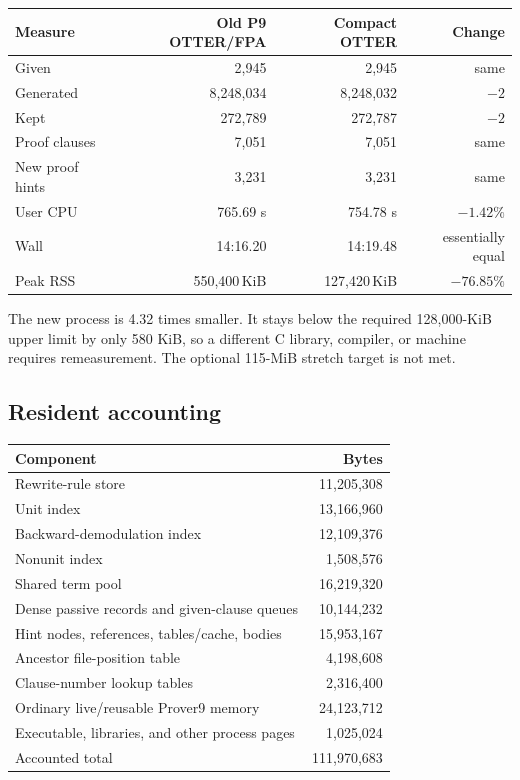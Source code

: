 \documentclass[11pt]{article}
\newcommand{\kib}{\,KiB}
\begin{document}
\begin{center}
\begin{tabular}{lrrr}
\toprule
Measure & Old P9 OTTER/FPA & Compact OTTER & Change \\
\midrule
Given & 2,945 & 2,945 & same \\
Generated & 8,248,034 & 8,248,032 & $-2$ \\
Kept & 272,789 & 272,787 & $-2$ \\
Proof clauses & 7,051 & 7,051 & same \\
New proof hints & 3,231 & 3,231 & same \\
User CPU & 765.69 s & 754.78 s & $-1.42\%$ \\
Wall & 14:16.20 & 14:19.48 & essentially equal \\
Peak RSS & 550,400\kib & 127,420\kib & $-76.85\%$ \\
\bottomrule
\end{tabular}
\end{center}

The new process is 4.32 times smaller.  It stays below the required
128,000-KiB upper limit by only 580 KiB, so a different C library, compiler, or
machine requires remeasurement.
The optional 115-MiB stretch target is not met.

\subsection{Resident accounting}

\begin{center}
\small
\begin{tabular}{lr}
\toprule
Component & Bytes \\
\midrule
Rewrite-rule store & 11,205,308 \\
Unit index & 13,166,960 \\
Backward-demodulation index & 12,109,376 \\
Nonunit index & 1,508,576 \\
Shared term pool & 16,219,320 \\
Dense passive records and given-clause queues & 10,144,232 \\
Hint nodes, references, tables/cache, bodies & 15,953,167 \\
Ancestor file-position table & 4,198,608 \\
Clause-number lookup tables & 2,316,400 \\
Ordinary live/reusable Prover9 memory & 24,123,712 \\
Executable, libraries, and other process pages & 1,025,024 \\
\midrule
Accounted total & 111,970,683 \\
\bottomrule
\end{tabular}
\end{center}
\end{document}
